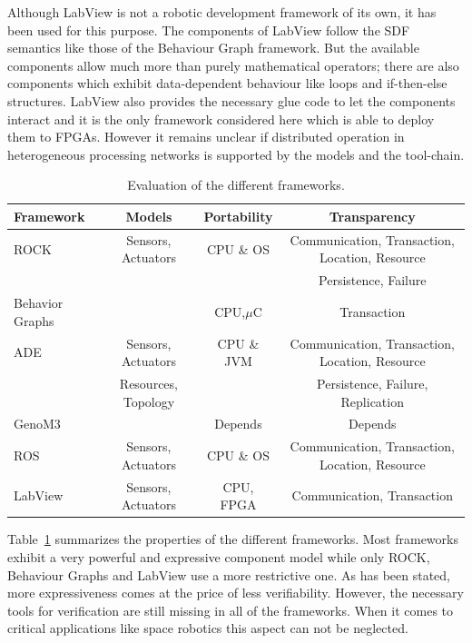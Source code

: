 \documentclass[a4paper,twocolumn]{esapub2005} %
\begin{document}
Although LabView is not a robotic development framework of its own, it has been used for this purpose.
The components of LabView follow the SDF semantics like those of the Behaviour Graph framework.
But the available components allow much more than purely mathematical operators; there are also components which exhibit data-dependent behaviour like loops and if-then-else structures.
LabView also provides the necessary glue code to let the components interact and it is the only framework considered here which is able to deploy them to FPGAs.
However it remains unclear if distributed operation in heterogeneous processing networks is supported by the models and the tool-chain.

\begin{table}
	\centering
	\begin{tabular}{l|ccc}
	\hline
	Framework        & Models & Portability & Transparency\\
	\hline
	ROCK             & Sensors, Actuators & CPU \& OS & Communication, Transaction, Location, Resource\\
	                 & & & Persistence, Failure\\
	Behavior Graphs  &        & CPU,$\mu$C & Transaction\\
	ADE              & Sensors, Actuators & CPU \& JVM & Communication, Transaction, Location, Resource\\
	                 & Resources, Topology & & Persistence, Failure, Replication\\
	GenoM3           & & Depends & Depends\\
	ROS              & Sensors, Actuators & CPU \& OS  & Communication, Transaction, Location, Resource\\
	LabView          & Sensors, Actuators & CPU, FPGA  & Communication, Transaction\\
	\end{tabular}
    \caption{
        Evaluation of the different frameworks.
    }
    \label{table:summary}
\end{table}

Table~\ref{table:summary} summarizes the properties of the different frameworks.
Most frameworks exhibit a very powerful and expressive component model while only ROCK, Behaviour Graphs and LabView use a more restrictive one.
As has been stated, more expressiveness comes at the price of less verifiability.
However, the necessary tools for verification are still missing in all of the frameworks.
When it comes to critical applications like space robotics this aspect can not be neglected.
\end{document}
